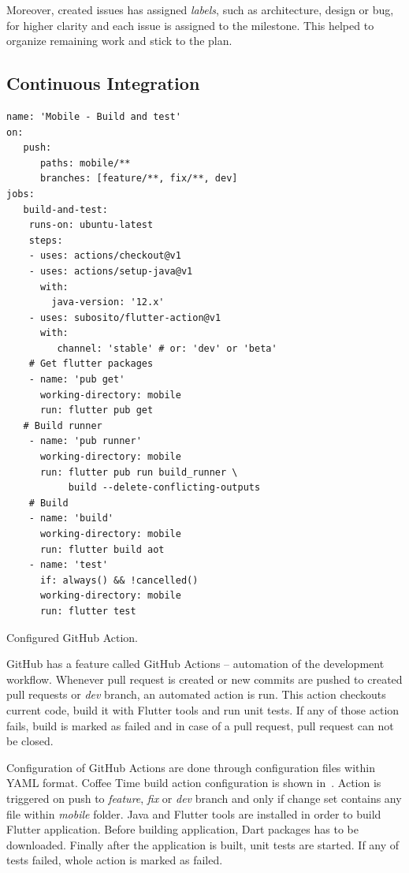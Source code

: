 Moreover, created issues has assigned \textit{labels}, such as architecture, design or bug, for higher clarity and each issue is assigned to the milestone. This helped to organize remaining work and stick to the plan. 

\subsection{Continuous Integration}

\begin{listing}[!h]
\begin{verbatim}
name: 'Mobile - Build and test'
on:
   push:
      paths: mobile/**
      branches: [feature/**, fix/**, dev]
jobs:
   build-and-test: 
    runs-on: ubuntu-latest
    steps:
    - uses: actions/checkout@v1 
    - uses: actions/setup-java@v1
      with:
        java-version: '12.x'
    - uses: subosito/flutter-action@v1
      with:
         channel: 'stable' # or: 'dev' or 'beta'
    # Get flutter packages
    - name: 'pub get'
      working-directory: mobile
      run: flutter pub get
   # Build runner
    - name: 'pub runner'
      working-directory: mobile
      run: flutter pub run build_runner \ 
           build --delete-conflicting-outputs
    # Build
    - name: 'build'
      working-directory: mobile
      run: flutter build aot
    - name: 'test'
      if: always() && !cancelled()
      working-directory: mobile
      run: flutter test
\end{verbatim}
\caption{Configured GitHub Action.}
\label{listing:gh-ci}
\end{listing}

GitHub has a feature called GitHub Actions -- automation of the development workflow. Whenever pull request is created or new commits are pushed to created pull requests or \textit{dev} branch, an automated action is run. This action checkouts current code, build it with Flutter tools and run unit tests. If any of those action fails, build is marked as failed and in case of a pull request, pull request can not be closed. 

Configuration of GitHub Actions are done through configuration files within YAML format. Coffee Time build action configuration is shown in~. Action is triggered on push to \textit{feature}, \textit{fix} or \textit{dev} branch and only if change set contains any file within \textit{mobile} folder. Java and Flutter tools are installed in order to build Flutter application. Before building application, Dart packages has to be downloaded. Finally after the application is built, unit tests are started. If any of tests failed, whole action is marked as failed.

